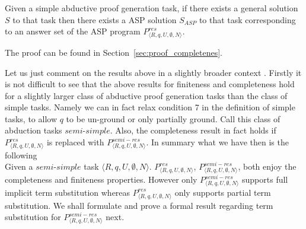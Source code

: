 
\begin{theorem}[Completeness]\label{thm:completeness}
  Given a simple abductive proof generation task, if there exists a general solution $S$ to that task then there
  exists a ASP solution $S_{ASP}$ to that task corresponding to an answer set of the ASP program $P_{\langle R,q,U,\emptyset,N\rangle}^{res}$.
\end{theorem}

The proof can be found in Section~\ref{sec:proof_completenes}.

Let us just comment on the results above in a slightly broader context . Firstly it is not difficult to see that the above results for finiteness and completeness hold for a slightly larger class of abductive proof generation tasks than the class of simple tasks. Namely we can in fact relax condition 7 in the definition of simple tasks, to allow $q$ to be un-ground or only partially ground. Call this class of abduction tasks $semi$-$simple$.  Also, the completeness result in fact holds if $P_{\langle R,q,U,\emptyset,N\rangle}^{res}$ is replaced with $P_{\langle R,q,U,\emptyset,N\rangle}^{semi-res}$. In summary what we have then is the following\\
Given a $\textit{semi-simple}$ task $\langle R,q,U,\emptyset,N\rangle$. $P_{\langle R,q,U,\emptyset,N\rangle}^{res}$, $P_{\langle R,q,U,\emptyset,N\rangle}^{semi-res}$, both enjoy the completeness and finiteness properties. However only $P_{\langle R,q,U,\emptyset,N\rangle}^{semi-res}$ supports full implicit term substitution whereas $P_{\langle R,q,U,\emptyset,N\rangle}^{res}$ only supports partial term substitution. We shall formulate and prove a formal result regarding term substitution for $P_{\langle R,q,U,\emptyset,N\rangle}^{semi-res}$ next.    

